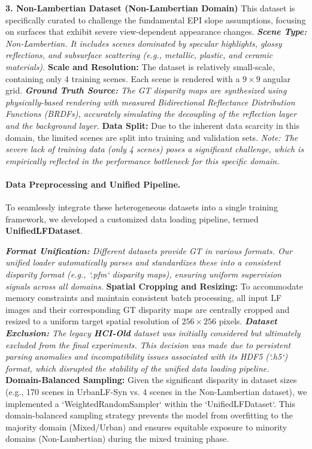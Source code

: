 \documentclass[lettersize,journal]{IEEEtran}
\begin{document}
\textbf{3. Non-Lambertian Dataset (Non-Lambertian Domain)}
This dataset is specifically curated to challenge the fundamental EPI slope assumptions, focusing on surfaces that exhibit severe view-dependent appearance changes.
\textit{ \textbf{Scene Type:} Non-Lambertian. It includes scenes dominated by specular highlights, glossy reflections, and subsurface scattering (e.g., metallic, plastic, and ceramic materials).
} \textbf{Scale and Resolution:} The dataset is relatively small-scale, containing only 4 training scenes. Each scene is rendered with a $9 \times 9$ angular grid. 
\textit{ \textbf{Ground Truth Source:} The GT disparity maps are synthesized using physically-based rendering with measured Bidirectional Reflectance Distribution Functions (BRDFs), accurately simulating the decoupling of the reflection layer and the background layer.
} \textbf{Data Split:} Due to the inherent data scarcity in this domain, the limited scenes are split into training and validation sets. \textit{Note: The severe lack of training data (only 4 scenes) poses a significant challenge, which is empirically reflected in the performance bottleneck for this specific domain.}

\paragraph{Data Preprocessing and Unified Pipeline.}

To seamlessly integrate these heterogeneous datasets into a single training framework, we developed a customized data loading pipeline, termed \textbf{UnifiedLFDataset}. 

\textit{ \textbf{Format Unification:} Different datasets provide GT in various formats. Our unified loader automatically parses and standardizes these into a consistent disparity format (e.g., `.pfm` disparity maps), ensuring uniform supervision signals across all domains.
} \textbf{Spatial Cropping and Resizing:} To accommodate memory constraints and maintain consistent batch processing, all input LF images and their corresponding GT disparity maps are centrally cropped and resized to a uniform target spatial resolution of $256 \times 256$ pixels.
\textit{ \textbf{Dataset Exclusion:} The legacy \textbf{HCI-Old} dataset was initially considered but ultimately excluded from the final experiments. This decision was made due to persistent parsing anomalies and incompatibility issues associated with its HDF5 (`.h5`) format, which disrupted the stability of the unified data loading pipeline.
} \textbf{Domain-Balanced Sampling:} Given the significant disparity in dataset sizes (e.g., 170 scenes in UrbanLF-Syn vs. 4 scenes in the Non-Lambertian dataset), we implemented a `WeightedRandomSampler` within the `UnifiedLFDataset`. This domain-balanced sampling strategy prevents the model from overfitting to the majority domain (Mixed/Urban) and ensures equitable exposure to minority domains (Non-Lambertian) during the mixed training phase.
\end{document}
